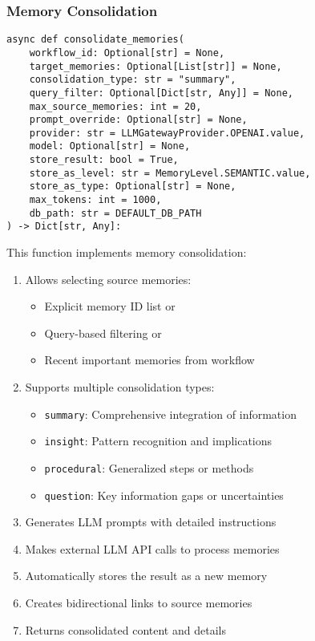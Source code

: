 \documentclass[12pt,a4paper]{article}
\newcommand{\code}[1]{\texttt{#1}}
\begin{document}
\subsubsection*{Memory Consolidation}
\begin{pageablecode}
\begin{verbatim}
async def consolidate_memories(
    workflow_id: Optional[str] = None,
    target_memories: Optional[List[str]] = None,
    consolidation_type: str = "summary",
    query_filter: Optional[Dict[str, Any]] = None,
    max_source_memories: int = 20,
    prompt_override: Optional[str] = None,
    provider: str = LLMGatewayProvider.OPENAI.value,
    model: Optional[str] = None,
    store_result: bool = True,
    store_as_level: str = MemoryLevel.SEMANTIC.value,
    store_as_type: Optional[str] = None,
    max_tokens: int = 1000,
    db_path: str = DEFAULT_DB_PATH
) -> Dict[str, Any]:
\end{verbatim}
\end{pageablecode}
This function implements memory consolidation:
\begin{enumerate}[label=\arabic*.]
    \item Allows selecting source memories:
    \begin{itemize}
        \item Explicit memory ID list or
        \item Query-based filtering or
        \item Recent important memories from workflow
    \end{itemize}
    \item Supports multiple consolidation types:
    \begin{itemize}
        \item \code{summary}: Comprehensive integration of information
        \item \code{insight}: Pattern recognition and implications
        \item \code{procedural}: Generalized steps or methods
        \item \code{question}: Key information gaps or uncertainties
    \end{itemize}
    \item Generates LLM prompts with detailed instructions
    \item Makes external LLM API calls to process memories
    \item Automatically stores the result as a new memory
    \item Creates bidirectional links to source memories
    \item Returns consolidated content and details
\end{enumerate}
\end{document}
